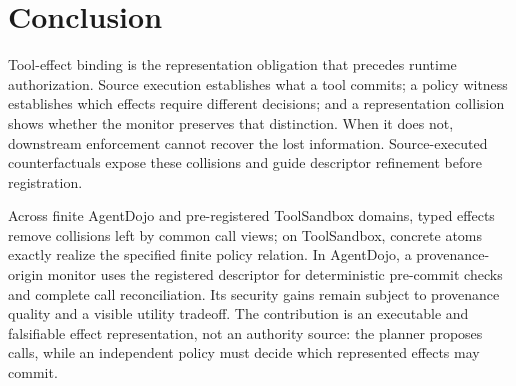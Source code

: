\section{Conclusion}

Tool-effect binding is the representation obligation that precedes runtime
authorization.  Source execution establishes what a tool commits; a policy
witness establishes which effects require different decisions; and a
representation collision shows whether the monitor preserves that distinction.
When it does not, downstream enforcement cannot recover the lost information.
Source-executed counterfactuals expose these collisions and guide descriptor
refinement before registration.

Across finite AgentDojo and pre-registered ToolSandbox domains, typed effects
remove collisions left by common call views; on ToolSandbox, concrete atoms
exactly realize the specified finite policy relation.  In AgentDojo, a
provenance-origin monitor uses the registered descriptor for deterministic
pre-commit checks and complete call reconciliation.  Its security gains remain
subject to provenance quality and a visible utility tradeoff.  The contribution
is an executable and falsifiable effect representation, not an authority source:
the planner proposes calls, while an independent policy must decide which
represented effects may commit.
\label{technical-body-end}
